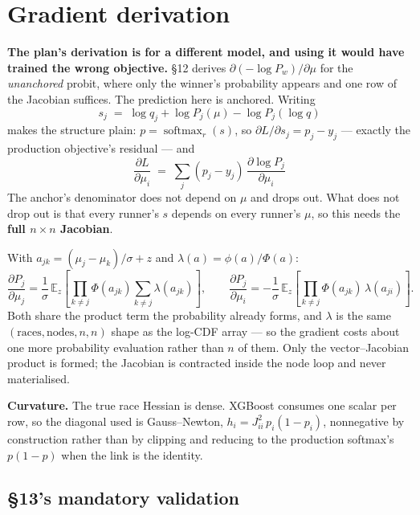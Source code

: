 \documentclass[11pt,a4paper]{article}
\begin{document}
\section{Gradient derivation}

\textbf{The plan's derivation is for a different model, and using it would have trained the
wrong objective.} §12 derives $\partial(-\log P_w)/\partial\mu$ for the \emph{unanchored}
probit, where only the winner's probability appears and one row of the Jacobian suffices. The
prediction here is anchored. Writing
\[
s_j \;=\; \log q_j + \log P_j(\mu) - \log P_j(\log q)
\]
makes the structure plain: $p = \operatorname{softmax}_r(s)$, so
$\partial L/\partial s_j = p_j - y_j$ --- exactly the production objective's residual --- and
\[
\boxed{\;\frac{\partial L}{\partial \mu_i} \;=\; \sum_j (p_j - y_j)\,
\frac{\partial \log P_j}{\partial \mu_i}\;}
\]
The anchor's denominator does not depend on $\mu$ and drops out. What does not drop out is that
every runner's $s$ depends on every runner's $\mu$, so this needs the \textbf{full $n\times n$
Jacobian}.

With $a_{jk} = (\mu_j-\mu_k)/\sigma + z$ and $\lambda(a)=\phi(a)/\Phi(a)$:
\[
\frac{\partial P_j}{\partial \mu_j} = \frac{1}{\sigma}\,\mathbb{E}_z\!\left[\prod_{k\neq j}\Phi(a_{jk})
\sum_{k\neq j}\lambda(a_{jk})\right],
\qquad
\frac{\partial P_j}{\partial \mu_i} = -\frac{1}{\sigma}\,\mathbb{E}_z\!\left[\prod_{k\neq j}\Phi(a_{jk})
\,\lambda(a_{ji})\right].
\]
Both share the product term the probability already forms, and $\lambda$ is the same
$(\text{races},\text{nodes},n,n)$ shape as the log-CDF array --- so the gradient costs about one
more probability evaluation rather than $n$ of them. Only the vector--Jacobian product is
formed; the Jacobian is contracted inside the node loop and never materialised.

\textbf{Curvature.} The true race Hessian is dense. XGBoost consumes one scalar per row, so the
diagonal used is Gauss--Newton, $h_i = J_{ii}^2\,p_i(1-p_i)$, nonnegative by construction rather
than by clipping and reducing to the production softmax's $p(1-p)$ when the link is the identity.

\subsection*{§13's mandatory validation}
\end{document}
